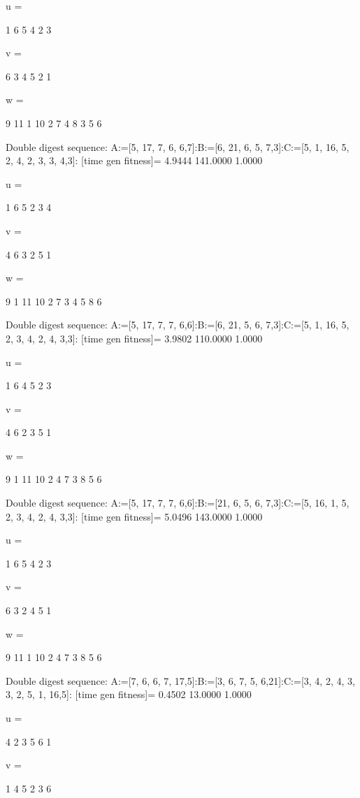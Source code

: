 u =

     1     6     5     4     2     3


v =

     6     3     4     5     2     1


w =

     9    11     1    10     2     7     4     8     3     5     6

Double digest sequence:
A:=[5, 17, 7, 6, 6,7]:B:=[6, 21, 6, 5, 7,3]:C:=[5, 1, 16, 5, 2, 4, 2, 3, 3, 4,3]:
[time gen fitness]=
    4.9444  141.0000    1.0000


u =

     1     6     5     2     3     4


v =

     4     6     3     2     5     1


w =

     9     1    11    10     2     7     3     4     5     8     6

Double digest sequence:
A:=[5, 17, 7, 7, 6,6]:B:=[6, 21, 5, 6, 7,3]:C:=[5, 1, 16, 5, 2, 3, 4, 2, 4, 3,3]:
[time gen fitness]=
    3.9802  110.0000    1.0000


u =

     1     6     4     5     2     3


v =

     4     6     2     3     5     1


w =

     9     1    11    10     2     4     7     3     8     5     6

Double digest sequence:
A:=[5, 17, 7, 7, 6,6]:B:=[21, 6, 5, 6, 7,3]:C:=[5, 16, 1, 5, 2, 3, 4, 2, 4, 3,3]:
[time gen fitness]=
    5.0496  143.0000    1.0000


u =

     1     6     5     4     2     3


v =

     6     3     2     4     5     1


w =

     9    11     1    10     2     4     7     3     8     5     6

Double digest sequence:
A:=[7, 6, 6, 7, 17,5]:B:=[3, 6, 7, 5, 6,21]:C:=[3, 4, 2, 4, 3, 3, 2, 5, 1, 16,5]:
[time gen fitness]=
    0.4502   13.0000    1.0000


u =

     4     2     3     5     6     1


v =

     1     4     5     2     3     6


